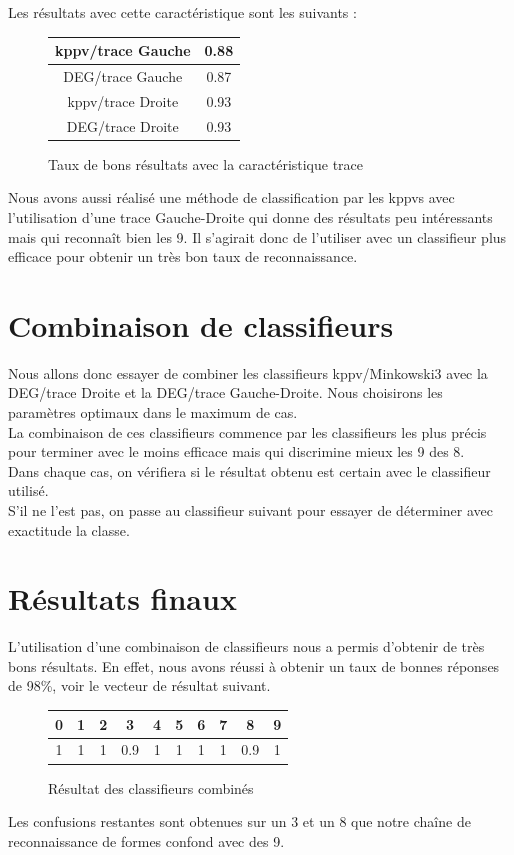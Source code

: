 Les résultats avec cette caractéristique sont les suivants :

\begin{figure}[h!]
\centering
\begin{tabular}{|*{2}{c|}}
    \hline
    kppv/trace Gauche & 0.88 \\
    \hline
    DEG/trace Gauche & 0.87 \\
    \hline
    kppv/trace Droite & 0.93 \\
    \hline
    DEG/trace Droite & 0.93 \\
    \hline
\end{tabular}
\caption{Taux de bons résultats avec la caractéristique trace}
\end{figure}

Nous avons aussi réalisé une méthode de classification par les kppvs
avec l'utilisation d'une trace Gauche-Droite qui donne des résultats 
peu intéressants mais qui reconnaît bien les 9. Il s'agirait donc de 
l'utiliser avec un classifieur plus efficace pour obtenir un très bon
taux de reconnaissance.

\section{Combinaison de classifieurs}

Nous allons donc essayer de combiner les classifieurs kppv/Minkowski3 avec la 
DEG/trace Droite et la DEG/trace Gauche-Droite. Nous choisirons les
paramètres optimaux dans le maximum de cas. \\
La combinaison de ces classifieurs commence par les classifieurs les plus
précis pour terminer avec le moins efficace mais qui discrimine mieux 
les 9 des 8. \\
Dans chaque cas, on vérifiera si le résultat obtenu est certain avec le classifieur utilisé.\\
S'il ne l'est pas, on passe au classifieur suivant pour essayer de déterminer avec exactitude la classe.

\section{Résultats finaux}

L'utilisation d'une combinaison de classifieurs nous a permis d'obtenir
de très bons résultats. En effet, nous avons réussi à obtenir un
taux de bonnes réponses de 98\%, voir le vecteur de résultat suivant.

\begin{figure}[h!]
\centering
\begin{tabular}{|*{10}{c|}}
    \hline
    0 & 1 & 2 & 3 & 4 & 5 & 6 & 7 & 8 & 9 \\
    \hline
    1 & 1 & 1 & 0.9 & 1 & 1 & 1 & 1 & 0.9 & 1  \\
    \hline
\end{tabular}
\caption{Résultat des classifieurs combinés}
\end{figure} 

Les confusions restantes sont obtenues sur un 3 et un 8 que notre
chaîne de reconnaissance de formes confond avec des 9. 
